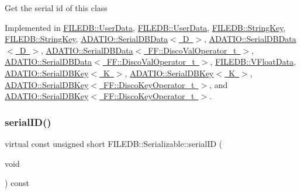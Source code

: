 Get the serial id of this class 

Implemented in \mbox{\hyperlink{classFILEDB_1_1UserData_a2d1cee48b497ef3f25957ecb1464b7f5}{F\+I\+L\+E\+D\+B\+::\+User\+Data}}, \mbox{\hyperlink{classFILEDB_1_1UserData_a2d1cee48b497ef3f25957ecb1464b7f5}{F\+I\+L\+E\+D\+B\+::\+User\+Data}}, \mbox{\hyperlink{classFILEDB_1_1StringKey_ad139b5cab667be479edae524f436805a}{F\+I\+L\+E\+D\+B\+::\+String\+Key}}, \mbox{\hyperlink{classFILEDB_1_1StringKey_ad139b5cab667be479edae524f436805a}{F\+I\+L\+E\+D\+B\+::\+String\+Key}}, \mbox{\hyperlink{classADATIO_1_1SerialDBData_a513643be38434a570d655602330aade9}{A\+D\+A\+T\+I\+O\+::\+Serial\+D\+B\+Data$<$ D $>$}}, \mbox{\hyperlink{classADATIO_1_1SerialDBData_a513643be38434a570d655602330aade9}{A\+D\+A\+T\+I\+O\+::\+Serial\+D\+B\+Data$<$ D $>$}}, \mbox{\hyperlink{classADATIO_1_1SerialDBData_a513643be38434a570d655602330aade9}{A\+D\+A\+T\+I\+O\+::\+Serial\+D\+B\+Data$<$ F\+F\+::\+Disco\+Val\+Operator\+\_\+t $>$}}, \mbox{\hyperlink{classADATIO_1_1SerialDBData_a513643be38434a570d655602330aade9}{A\+D\+A\+T\+I\+O\+::\+Serial\+D\+B\+Data$<$ F\+F\+::\+Disco\+Val\+Operator\+\_\+t $>$}}, \mbox{\hyperlink{classFILEDB_1_1VFloatData_a63b06bc5c69783fcbb4ab699b2633815}{F\+I\+L\+E\+D\+B\+::\+V\+Float\+Data}}, \mbox{\hyperlink{classADATIO_1_1SerialDBKey_a0d088e08f453fd38a906208783f788d7}{A\+D\+A\+T\+I\+O\+::\+Serial\+D\+B\+Key$<$ K $>$}}, \mbox{\hyperlink{classADATIO_1_1SerialDBKey_a0d088e08f453fd38a906208783f788d7}{A\+D\+A\+T\+I\+O\+::\+Serial\+D\+B\+Key$<$ K $>$}}, \mbox{\hyperlink{classADATIO_1_1SerialDBKey_a0d088e08f453fd38a906208783f788d7}{A\+D\+A\+T\+I\+O\+::\+Serial\+D\+B\+Key$<$ F\+F\+::\+Disco\+Key\+Operator\+\_\+t $>$}}, and \mbox{\hyperlink{classADATIO_1_1SerialDBKey_a0d088e08f453fd38a906208783f788d7}{A\+D\+A\+T\+I\+O\+::\+Serial\+D\+B\+Key$<$ F\+F\+::\+Disco\+Key\+Operator\+\_\+t $>$}}.

\mbox{\label{classFILEDB_1_1Serializable_a5d639b5dbd5d8ebc7dca1eca31bbc868}} 
\subsubsection{\texorpdfstring{serialID()}{serialID()}\hspace{0.1cm}{\footnotesize\ttfamily [2/2]}}
{\footnotesize\ttfamily virtual const unsigned short F\+I\+L\+E\+D\+B\+::\+Serializable\+::serial\+ID (\begin{DoxyParamCaption}\item[{void}]{ }\end{DoxyParamCaption}) const\hspace{0.3cm}{\ttfamily [pure virtual]}}

